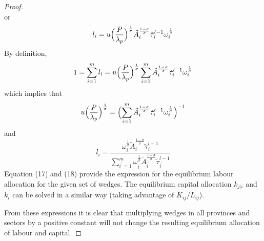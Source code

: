 \documentclass{article}
\begin{document}
\begin{proof}
\begin{equation*}
    \end{equation*}
    or 
    \begin{equation*}
        l_i=u \Bigl( \frac{P}{\lambda_p} \Bigr)^{\frac{1}{\sigma}} \tilde{A}_i^{\frac{1-\sigma}{\sigma}} \tilde{\tau}_i^{l-1} \omega_i^{\frac{1}{\sigma}}
    \end{equation*}
    By definition,
    \begin{equation*}
        1=\sum_{i=1}^m l_i=u \Bigl( \frac{P}{\lambda_p} \Bigr)^{\frac{1}{\sigma}} \sum_{i=1}^m \tilde{A}_i^{\frac{1-\sigma}{\sigma}} \tilde{\tau}_i^{l-1} \omega_i^{\frac{1}{\sigma}}
    \end{equation*}
    which implies that
    \begin{equation*}
        u \Bigl( \frac{P}{\lambda_p} \Bigr)^{\frac{1}{\sigma}}= \Bigl( \sum_{i=1}^m \tilde{A}_i^{\frac{1-\sigma}{\sigma}} \tilde{\tau}_i^{l-1} \omega_i^{\frac{1}{\sigma}} \Bigr)^{-1}
    \end{equation*}
    and
    \begin{equation}
        l_i=\frac{\omega_i^{\frac{1}{\sigma}} \tilde{A}_i^{\frac{1-\sigma}{\sigma}} \tilde{\tau}_i^{l-1}}{\sum_{i^\prime=1}^m \omega_{i^\prime}^{\frac{1}{\sigma}} \tilde{A}_{i^\prime}^{\frac{1-\sigma}{\sigma}} \tilde{\tau}_{i^\prime}^{l-1}}
    \end{equation}
    Equation (17) and (18) provide the expression for the equilibrium labour allocation for the given set of wedges. The equilibrium capital allocation $k_{j|i}$ and $k_i$ can be solved in a similar way (taking advantage of $K_{ij}/L_{ij}$).

    From these expressions it is clear that multiplying wedges in all provinces and sectors by a positive constant will not change the resulting equilibrium allocation of labour and capital.
\end{proof}
\end{document}

